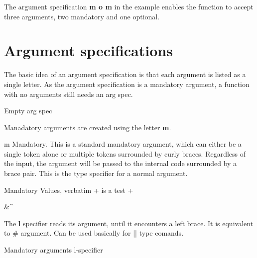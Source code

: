     
The argument specification \textbf{m o m} in the example enables the function to accept three arguments, two mandatory and one optional. 


\section{Argument specifications}

The basic idea of an argument specification is that each argument is listed as a single letter. 
As the argument specification is a mandatory argument, a function with no arguments still needs an arg spec.

\begin{texexample}{Empty arg spec}{}
\DeclareDocumentCommand{}
\atest
\end{texexample}

Manadatory arguments are created using the letter \textbf{m}.

\begin{marglist}
\item [m] Mandatory. This is a standard mandatory argument, which can either be a single token alone or multiple tokens surrounded by curly braces. Regardless of the input, the argument will
be passed to the internal code surrounded by a brace pair. This is the  type
specifier for a normal \tex argument.
\end{marglist}

\begin{texexample}{Mandatory Values, verbatim}{}
\DeclareDocumentCommand{}
\testverbatim+ \this is a test +

\testverbatim * &^%

\end{texexample}

The \textbf{l} specifier reads its argument, until it encounters a left brace. It is equivalent to \tex \# argument. Can be used basically for |\hbox| type comands.

\begin{texexample}{Mandatory arguments l-specifier}{}
\DeclareDocumentCommand{}
\end{texexample}



